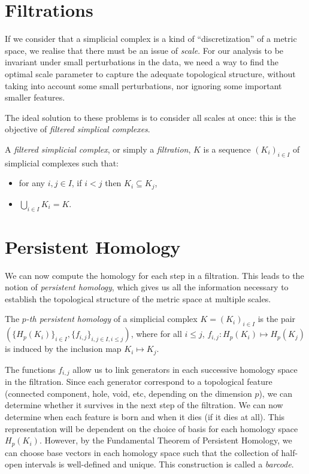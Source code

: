 \documentclass[a4paper,11pt,openany,extrafontsizes]{memoir}
\begin{document}
\section{Filtrations}%
\label{sec:filtrations}

If we consider that a simplicial complex is a kind of
``discretization'' of a metric space, we realise that there must be an
issue of \emph{scale}. For our analysis to be invariant under small
perturbations in the data, we need a way to find the optimal scale
parameter to capture the adequate topological structure, without
taking into account some small perturbations, nor ignoring some
important smaller features.


The ideal solution to these problems is to consider all scales at
once: this is the objective of \emph{filtered simplical complexes}.

\begin{defn}[Filtration]
  A \emph{filtered simplicial complex}, or simply a \emph{filtration},
  $K$ is a sequence ${(K_i)}_{i\in I}$ of simplicial complexes such
  that:
  \begin{itemize}
  \item for any $i, j \in I$, if $i < j$ then $K_i \subseteq K_j$,
  \item $\bigcup_{i\in I} K_i = K$.
  \end{itemize}
\end{defn}

\section{Persistent Homology}%
\label{sec:persistent-homology}

We can now compute the homology for each step in a filtration. This
leads to the notion of \emph{persistent homology}, which gives us all
the information necessary to establish the topological structure of
the metric space at multiple scales.

\begin{defn}
  The \emph{$p$-th persistent homology} of a simplicial complex
  $K = {(K_i)}_{i\in I}$ is the pair
  $(\{H_p(K_i)\}_{i\in I}, \{f_{i,j}\}_{i,j\in I, i\leq j})$, where
  for all $i\leq j$, $f_{i,j} : H_p(K_i) \mapsto H_p(K_j)$ is induced
  by the inclusion map $K_i \mapsto K_j$.
\end{defn}

The functions $f_{i,j}$ allow us to link generators in each successive
homology space in the filtration. Since each generator correspond to a
topological feature (connected component, hole, void, etc, depending
on the dimension $p$), we can determine whether it survives in the
next step of the filtration. We can now determine when each feature is
born and when it dies (if it dies at all). This representation will be
dependent on the choice of basis for each homology space
$H_p(K_i)$. However, by the Fundamental Theorem of Persistent
Homology, we can choose base vectors in each homology space such that
the collection of half-open intervals is well-defined and unique. This
construction is called a \emph{barcode}.
\end{document}
